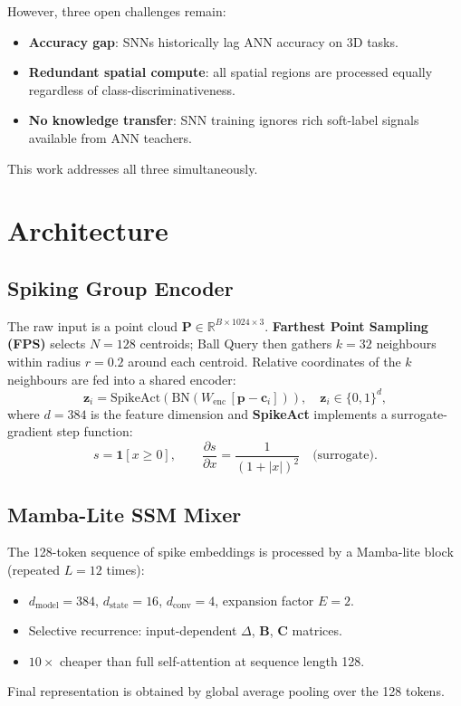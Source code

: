 \documentclass[11pt,a4paper]{article}
\begin{document}
However, three open challenges remain:
\begin{itemize}
  \item \textbf{Accuracy gap}: SNNs historically lag ANN accuracy on 3D tasks.
  \item \textbf{Redundant spatial compute}: all spatial regions are processed equally regardless of class-discriminativeness.
  \item \textbf{No knowledge transfer}: SNN training ignores rich soft-label signals available from ANN teachers.
\end{itemize}

This work addresses all three simultaneously.

\section{Architecture}

\subsection{Spiking Group Encoder}

The raw input is a point cloud $\mathbf{P} \in \mathbb{R}^{B \times 1024 \times 3}$. \textbf{Farthest Point Sampling (FPS)} selects $N=128$ centroids; Ball Query then gathers $k=32$ neighbours within radius $r=0.2$ around each centroid. Relative coordinates of the $k$ neighbours are fed into a shared encoder:
\[
\mathbf{z}_i = \text{SpikeAct}\!\left(\text{BN}\!\left(W_{\text{enc}}\,[\mathbf{p} - \mathbf{c}_i]\right)\right), \quad \mathbf{z}_i \in \{0,1\}^{d},
\]
where $d=384$ is the feature dimension and \textbf{SpikeAct} implements a surrogate-gradient step function:
\[
s = \mathbf{1}[x \geq 0], \qquad \frac{\partial s}{\partial x} = \frac{1}{(1+|x|)^2}\quad\text{(surrogate)}.
\]

\subsection{Mamba-Lite SSM Mixer}

The 128-token sequence of spike embeddings is processed by a Mamba-lite block (repeated $L=12$ times):
\begin{itemize}
  \item $d_{\text{model}}=384$, $d_{\text{state}}=16$, $d_{\text{conv}}=4$, expansion factor $E=2$.
  \item Selective recurrence: input-dependent $\Delta$, $\mathbf{B}$, $\mathbf{C}$ matrices.
  \item $10\times$ cheaper than full self-attention at sequence length 128.
\end{itemize}
Final representation is obtained by global average pooling over the 128 tokens.
\end{document}
